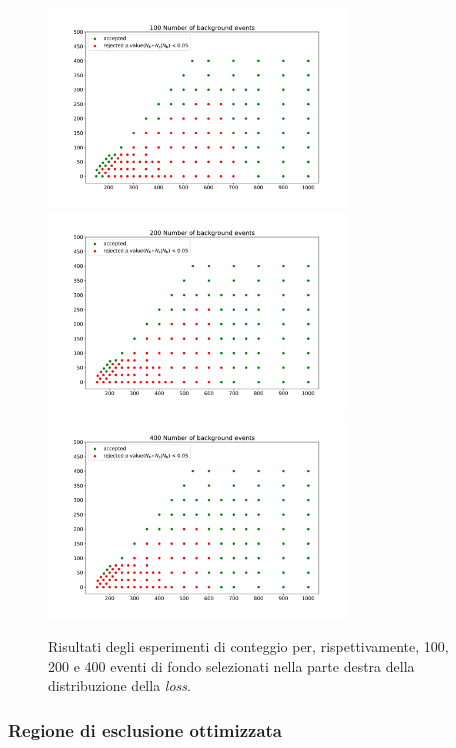 \begin{figure}[h!]
	\centering
	\includegraphics[width=0.71\textwidth]{figs/risultati_simulazione/100.pdf}
	\includegraphics[width=0.71\textwidth]{figs/risultati_simulazione/200.pdf}
	\includegraphics[width=0.71\textwidth]{figs/risultati_simulazione/400.pdf}
	\caption{Risultati degli esperimenti di conteggio per, rispettivamente, 100, 200 e 400 eventi di fondo selezionati nella parte destra della distribuzione della \textit{loss}.}
	\label{test-100-200-400}
\end{figure}



\subsubsection{Regione di esclusione ottimizzata}
\label{regione di esclusione}


